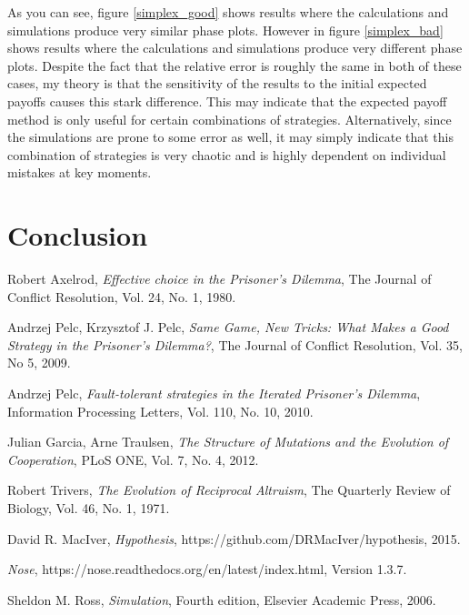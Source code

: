 \documentclass[a4paper,12pt]{article}
\begin{document}
\begin{figure}
\end{figure}

As you can see, figure \ref{simplex_good} shows results where the calculations and simulations produce very similar phase plots.
However in figure \ref{simplex_bad} shows results where the calculations and simulations produce very different phase plots.
Despite the fact that the relative error is roughly the same in both of these cases, my theory is that the sensitivity of the results to the initial expected payoffs causes this stark difference.
This may indicate that the expected payoff method is only useful for certain combinations of strategies.
Alternatively, since the simulations are prone to some error as well, it may simply indicate that this combination of strategies is very chaotic and is highly dependent on individual mistakes at key moments.

\section{Conclusion}

\begin{thebibliography}{9}

        Robert Axelrod,
        \emph{Effective choice in the Prisoner's Dilemma},
        The Journal of Conflict Resolution,
        Vol. 24,
        No. 1,
        1980.

        Andrzej Pelc, Krzysztof J. Pelc,
        \emph{Same Game, New Tricks: What Makes a Good Strategy in the Prisoner's Dilemma?},
        The Journal of Conflict Resolution,
        Vol. 35,
        No 5,
        2009.

        Andrzej Pelc,
        \emph{Fault-tolerant strategies in the Iterated Prisoner's Dilemma},
        Information Processing Letters,
        Vol. 110,
        No. 10,
        2010.

        Julian Garcia, Arne Traulsen,
        \emph{The Structure of Mutations and the Evolution of Cooperation},
        PLoS ONE,
        Vol. 7,
        No. 4,
        2012.

        Robert Trivers,
        \emph{The Evolution of Reciprocal Altruism},
        The Quarterly Review of Biology,
        Vol. 46,
        No. 1,
        1971.

        David R. MacIver,
        \emph{Hypothesis},
        https://github.com/DRMacIver/hypothesis,
        2015.

        \emph{Nose},
        https://nose.readthedocs.org/en/latest/index.html,
        Version 1.3.7.

        Sheldon M. Ross,
        \emph{Simulation},
        Fourth edition,
        Elsevier Academic Press,
        2006.

\end{thebibliography}
\end{document}

